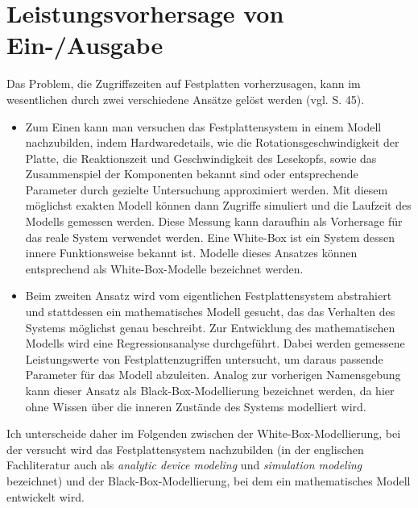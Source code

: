 \documentclass[
	12pt,
	a4paper,
	BCOR10mm,
	DIV14,
	listof=totoc,
	bibliography=totoc,
	headsepline
]{scrreprt}
\begin{document}
\section{Leistungsvorhersage von Ein-/Ausgabe}
\label{rel_ea-vorhersage}
Das Problem, die Zugriffszeiten auf Festplatten vorherzusagen, kann im wesentlichen durch zwei verschiedene Ansätze gelöst werden (vgl. \cite{Crume:2013:FML:2538542.2538561} S. 45).
\begin{itemize}
\item  Zum Einen kann man versuchen das Festplattensystem in einem Modell nachzubilden, indem Hardwaredetails, wie die Rotationsgeschwindigkeit der Platte, die Reaktionszeit und Geschwindigkeit des Lesekopfs, sowie das Zusammenspiel der Komponenten bekannt sind oder entsprechende Parameter durch gezielte Untersuchung approximiert werden. Mit diesem möglichst exakten Modell können dann Zugriffe simuliert und die Laufzeit des Modells gemessen werden. Diese Messung kann daraufhin als Vorhersage für das reale System verwendet werden. Eine White-Box ist ein System dessen innere Funktionsweise bekannt ist. Modelle dieses Ansatzes können entsprechend als White-Box-Modelle bezeichnet werden.
\item Beim zweiten Ansatz wird vom eigentlichen Festplattensystem abstrahiert und stattdessen ein mathematisches Modell gesucht, das das Verhalten des Systems möglichst genau beschreibt.
Zur Entwicklung des mathematischen Modells wird eine Regressionsanalyse durchgeführt. Dabei werden gemessene Leistungswerte von Festplattenzugriffen untersucht, um daraus passende Parameter für das Modell abzuleiten. Analog zur vorherigen Namensgebung kann dieser Ansatz als Black-Box-Modellierung bezeichnet werden, da hier ohne Wissen über die inneren Zustände des Systems modelliert wird.
\end{itemize}
Ich unterscheide daher im Folgenden zwischen der White-Box-Modellierung, bei der versucht wird das Festplattensystem nachzubilden (in der englischen Fachliteratur auch als \textit{analytic device modeling} und \textit{simulation modeling} bezeichnet) und der Black-Box-Modellierung, bei dem ein mathematisches Modell entwickelt wird.
\end{document}
